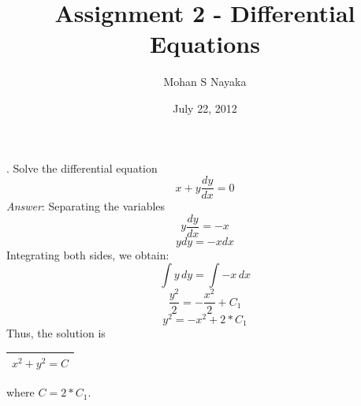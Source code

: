 \documentclass[a4paper,11pt]{article}
\begin{document}
\title{Assignment 2 - Differential Equations}
\date{July 22, 2012}
\author{Mohan S Nayaka}

. Solve the differential equation
\[ x + y \frac{dy}{dx} = 0 \]
\emph{Answer}:
Separating the variables
\[ y \frac{dy}{dx} = -x \]
\[ ydy = -xdx \]
Integrating both sides, we obtain:
\[ \int y\,dy = \int -x\,dx \]
\[ \frac{y^2}{2} = -\frac{x^2}{2} + C_1 \]
\[ y^2 = -x^2 + 2 * C_1 \]
Thus, the solution is
{\renewcommand{\arraystretch}{1.5}
\begin{tabular}{|c|}
\hline
$x^2 + y^2 = C$ \\
\hline
\end{tabular}}
\begin{center}
where $C = 2 * C_1$.
\end{center}
\end{document}
